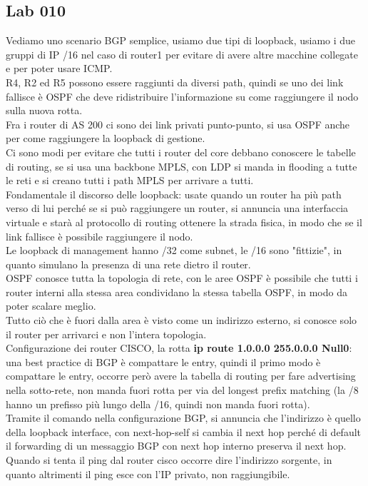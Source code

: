 \documentclass[12pt, oneside]{extbook} %
\begin{document}
\subsection*{Lab 010}
Vediamo uno scenario BGP semplice, usiamo due tipi di loopback, usiamo i due gruppi di IP /16 nel caso di router1 per evitare di avere altre macchine collegate e per poter usare ICMP.
\\R4, R2 ed R5 possono essere raggiunti da diversi path, quindi se uno dei link fallisce è OSPF che deve ridistribuire l'informazione su come raggiungere il nodo sulla nuova rotta.
\\Fra i router di AS 200 ci sono dei link privati punto-punto, si usa OSPF anche per come raggiungere la loopback di gestione.
\\Ci sono modi per evitare che tutti i router del core debbano conoscere le tabelle di routing, se si usa una backbone MPLS, con LDP si manda in flooding a tutte le reti e si creano tutti i path MPLS per arrivare a tutti.
\\Fondamentale il discorso delle loopback: usate quando un router ha più path verso di lui perché se si può raggiungere un router, si annuncia una interfaccia virtuale e starà al protocollo di routing ottenere la strada fisica, in modo che se il link fallisce è possibile raggiungere il nodo.
\\Le loopback di management hanno /32 come subnet, le /16 sono "fittizie", in quanto simulano la presenza di una rete dietro il router.
\\OSPF conosce tutta la topologia di rete, con le aree OSPF è possibile che tutti i router interni alla stessa area condividano la stessa tabella OSPF, in modo da poter scalare meglio.
\\Tutto ciò che è fuori dalla area è visto come un indirizzo esterno, si conosce solo il router per arrivarci e non l'intera topologia.
\\Configurazione dei router CISCO, la rotta \textbf{ip route 1.0.0.0 255.0.0.0 Null0}: una best practice di BGP è compattare le entry, quindi il primo modo è compattare le entry, occorre però avere la tabella di routing per fare advertising nella sotto-rete, non manda fuori rotta per via del longest prefix matching (la /8 hanno un prefisso più lungo della /16, quindi non manda fuori rotta).
\\Tramite il comando nella configurazione BGP, si annuncia che l'indirizzo è quello della loopback interface, con next-hop-self si cambia il next hop perché di default il forwarding di un messaggio BGP con next hop interno preserva il next hop.
\\Quando si tenta il ping dal router cisco occorre dire l'indirizzo sorgente, in quanto altrimenti il ping esce con l'IP privato, non raggiungibile.
\end{document}
